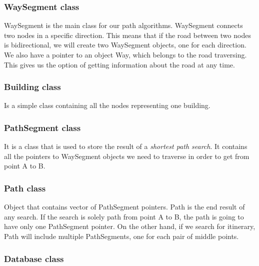 \subsubsection{WaySegment class}
WaySegment is the main class for our path algorithms. WaySegment connects two nodes in a specific direction. This means that if the road between two nodes is bidirectional, we will create two WaySegment objects, one for each direction. We also have a pointer to an object Way, which belongs to the road traversing. This gives us the option of getting information about the road at any time.

\subsubsection{Building class}
Is a simple class containing all the nodes representing one building.

\subsubsection{PathSegment class}
It is a class that is used to store the result of a \textit{shortest path search}. It contains all the pointers to WaySegment objects we need to traverse in order to get from point A to B. 

\subsubsection{Path class}
Object that contains vector of PathSegment pointers. Path is the end result of any search. If the search is solely path from point A to B, the path is going to have only one PathSegment pointer. On the other hand, if we search for itinerary, Path will include multiple PathSegments, one for each pair of middle points.

\subsubsection{Database class}

